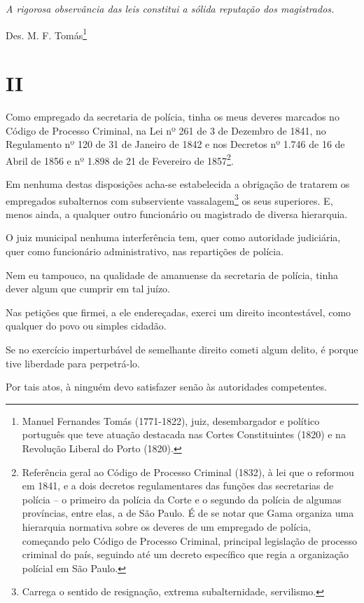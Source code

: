 \asterisc{}

\emph{A rigorosa observância das leis constitui a sólida reputação dos
magistrados.}

Des. M. F. Tomás\footnote{Manuel Fernandes Tomás (1771-1822), juiz,
  desembargador e político português que teve atuação destacada nas
  Cortes Constituintes (1820) e na Revolução Liberal do Porto (1820).}

\section{II}

Como empregado da secretaria de polícia, tinha os meus deveres marcados
no Código de Processo Criminal, na Lei nº 261 de 3 de Dezembro de 1841,
no Regulamento nº 120 de 31 de Janeiro de 1842 e nos Decretos nº 1.746
de 16 de Abril de 1856 e nº 1.898 de 21 de Fevereiro de 1857\footnote{
  Referência geral ao Código de Processo Criminal (1832), à lei que o
  reformou em 1841, e a dois decretos regulamentares das funções das
  secretarias de polícia -- o primeiro da polícia da Corte e o segundo
  da polícia de algumas províncias, entre elas, a de São Paulo. É de se
  notar que Gama organiza uma hierarquia normativa sobre os deveres de
  um empregado de polícia, começando pelo Código de Processo Criminal,
  principal legislação de processo criminal do país, seguindo até um
  decreto específico que regia a organização polícial em São Paulo.}.

Em nenhuma destas disposições acha-se estabelecida a obrigação de
tratarem os empregados subalternos com subserviente
vassalagem\footnote{Carrega o sentido de resignação, extrema
  subalternidade, servilismo.} os seus superiores. E, menos ainda, a
qualquer outro funcionário ou magistrado de diversa hierarquia.

O juiz municipal nenhuma interferência tem, quer como autoridade
judiciária, quer como funcionário administrativo, nas repartições de
polícia.

Nem eu tampouco, na qualidade de amanuense da secretaria de polícia,
tinha dever algum que cumprir em tal juízo.

Nas petições que firmei, a ele endereçadas, exerci um direito
incontestável, como qualquer do povo ou simples cidadão.

Se no exercício imperturbável de semelhante direito cometi algum delito,
é porque tive liberdade para perpetrá-lo.

Por tais atos, à ninguém devo satisfazer senão às autoridades
competentes.

